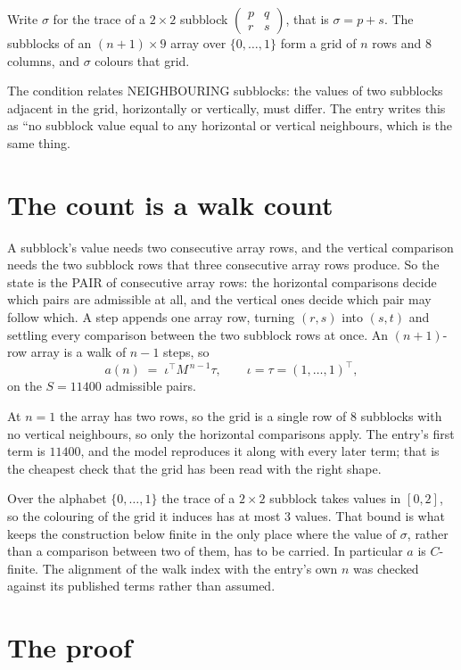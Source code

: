\documentclass[11pt,a4paper]{article}
\theoremstyle{plain}
\theoremstyle{definition}
\begin{document}
Write $\sigma$ for the trace of a $2\times2$ subblock
$\begin{pmatrix}p&q\\r&s\end{pmatrix}$, that is $\sigma=p+s$. The subblocks of an
$(n+1)\times9$ array over $\{0,\dots,1\}$ form a grid of $n$ rows and $8$
columns, and $\sigma$ colours that grid.

The condition relates NEIGHBOURING subblocks: the values of two subblocks adjacent in the grid,
horizontally or vertically, must differ. The entry writes this as ``no subblock value equal to any horizontal or vertical neighbours, which is the same thing.

\section{The count is a walk count}

A subblock's value needs two consecutive array rows, and the vertical
comparison needs the two subblock rows that three consecutive array rows produce. So the state
is the PAIR of consecutive array rows: the horizontal comparisons decide which pairs are
admissible at all, and the vertical ones decide which pair may follow which. A step appends one
array row, turning $(r,s)$ into $(s,t)$ and settling every comparison between the two subblock
rows at once. An $(n+1)$-row array is a walk of $n-1$ steps, so
\[
a(n)\;=\;\iota^{\!\top}M^{\,n-1}\tau,\qquad\iota=\tau=(1,\dots,1)^{\!\top},
\]
on the $S=11400$ admissible pairs.

At $n=1$ the array has two rows, so the grid is a single row of $8$
subblocks with no vertical neighbours, so only the horizontal comparisons apply. The
entry's first term is $11400$, and the model reproduces it along with every later term; that
is the cheapest check that the grid has been read with the right shape.

Over the alphabet $\{0,\dots,1\}$ the trace of a $2\times2$ subblock takes values in
$[0,2]$, so the colouring of the grid it induces has at most $3$ values.
That bound is what keeps the construction below finite in the only place where the value of
$\sigma$, rather than a comparison between two of them, has to be carried.
In particular $a$ is $C$-finite. The alignment of the walk index with the entry's own $n$ was
checked against its published terms rather than assumed.

\section{The proof}
\end{document}

